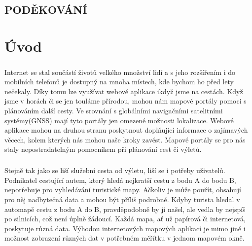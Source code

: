 \documentclass[11pt,a4paper,titlepage,oneside]{book}
\begin{document}
\newpage %
	\vspace*{15cm}
	\section*{\Large PODĚKOVÁNÍ}
	\paragraph{}
		
\renewcommand{\baselinestretch}{1.5} %
\newpage %
\pagestyle{plain}
\setcounter{page}{5}

	\tableofcontents

\newpage %
	\listoffigures

\newpage %
\chapter*{Úvod}


	\paragraph{} Internet se stal součástí životů velkého množství lidí a s jeho rozšířením i do mobilních telefonů je dostupný na mnoha místech, kde bychom ho před lety nečekaly. Díky tomu lze využívat webové aplikace ikdyž jsme na cestách. Když jsme v horách či se jen touláme přírodou, mohou nám mapové portály pomoci s plánováním další cesty. Ve srovnání s globálními navigačními satelitními systémy(GNSS) mají tyto portály jen omezené možnosti lokalizace. Webové aplikace mohou na druhou stranu poskytnout doplňující informace o zajímavých věcech, kolem kterých nás mohou naše kroky zavést. Mapové portály se pro nás staly nepostradatelným pomocníkem při plánování cest či výletů. 
	\paragraph{} Stejně tak jako se liší služební cesta od výletu, liší se i potřeby uživatelů. Podnikatel cestující autem, který hledá nejkratší cestu z bodu A do bodu B, nepotřebuje pro vyhledávání turistické mapy. Ačkoliv je může použít, obsahují pro něj nadbytečná data a mohou být příliš podrobné. Kdyby turista hledal v automapě cestu z bodu A do B, pravděpodobně by ji našel, ale vedla by nejspíš po silnicích, což není úplně žádoucí. Každá mapa, ať už papírová či internetová, poskytuje různá data. Výhodou internetových mapových aplikací je mimo jiné i možnost zobrazení různých dat v potřebném měřítku v jednom mapovém okně.
\end{document}
